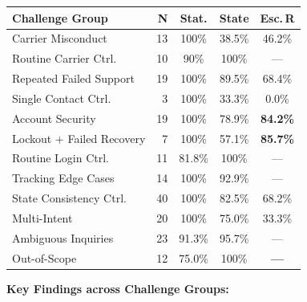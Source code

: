 \documentclass[10pt,twocolumn,a4paper]{article}
\newcommand{\good}[1]{\textbf{\textcolor{accentgreen}{#1}}}
\begin{document}
\medskip
\begin{center}
\small
\setlength{\tabcolsep}{3.5pt}
\renewcommand{\arraystretch}{1.1}
\begin{tabularx}{\columnwidth}{@{}Xrccc@{}}
\toprule
\textbf{Challenge Group} & \textbf{N} & \textbf{Stat.} & \textbf{State} & \textbf{Esc.\,R} \\
\midrule
\rowcolor{rowalt}
Carrier Misconduct        & 13 & 100\% & 38.5\%  & 46.2\% \\
Routine Carrier Ctrl.     & 10 & 90\%  & 100\%   & --- \\
\rowcolor{rowalt}
Repeated Failed Support   & 19 & 100\% & 89.5\%  & 68.4\% \\
Single Contact Ctrl.      &  3 & 100\% & 33.3\%  & 0.0\% \\
\rowcolor{rowalt}
Account Security          & 19 & 100\% & 78.9\%  & \good{84.2\%} \\
Lockout + Failed Recovery &  7 & 100\% & 57.1\%  & \good{85.7\%} \\
\rowcolor{rowalt}
Routine Login Ctrl.       & 11 & 81.8\%& 100\%   & --- \\
Tracking Edge Cases       & 14 & 100\% & 92.9\%  & --- \\
\rowcolor{rowalt}
State Consistency Ctrl.   & 40 & 100\% & 82.5\%  & 68.2\% \\
Multi-Intent              & 20 & 100\% & 75.0\%  & 33.3\% \\
\rowcolor{rowalt}
Ambiguous Inquiries       & 23 & 91.3\%& 95.7\%  & --- \\
Out-of-Scope              & 12 & 75.0\%& 100\%   & \good{---} \\
\bottomrule
\end{tabularx}
\label{tab:challenges}
\end{center}

\medskip
\noindent\textbf{Key Findings across Challenge Groups:}
\end{document}
